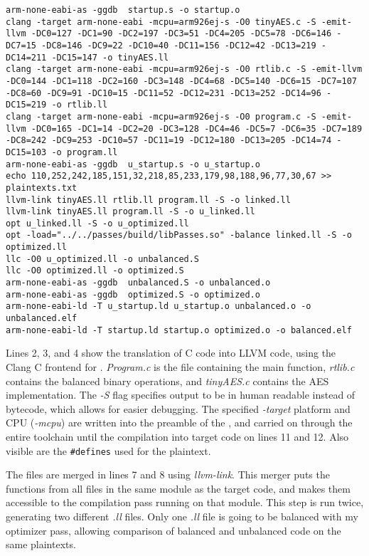 \begin{lstlisting}[caption=Output of the Makefile, label=lst:makefile-output]
arm-none-eabi-as -ggdb  startup.s -o startup.o
clang -target arm-none-eabi -mcpu=arm926ej-s -O0 tinyAES.c -S -emit-llvm -DC0=127 -DC1=90 -DC2=197 -DC3=51 -DC4=205 -DC5=78 -DC6=146 -DC7=15 -DC8=146 -DC9=22 -DC10=40 -DC11=156 -DC12=42 -DC13=219 -DC14=211 -DC15=147 -o tinyAES.ll
clang -target arm-none-eabi -mcpu=arm926ej-s -O0 rtlib.c -S -emit-llvm -DC0=144 -DC1=118 -DC2=160 -DC3=148 -DC4=68 -DC5=140 -DC6=15 -DC7=107 -DC8=60 -DC9=91 -DC10=15 -DC11=52 -DC12=231 -DC13=252 -DC14=96 -DC15=219 -o rtlib.ll
clang -target arm-none-eabi -mcpu=arm926ej-s -O0 program.c -S -emit-llvm -DC0=165 -DC1=14 -DC2=20 -DC3=128 -DC4=46 -DC5=7 -DC6=35 -DC7=189 -DC8=242 -DC9=253 -DC10=57 -DC11=19 -DC12=180 -DC13=205 -DC14=74 -DC15=103 -o program.ll
arm-none-eabi-as -ggdb  u_startup.s -o u_startup.o
echo 110,252,242,185,151,32,218,85,233,179,98,188,96,77,30,67 >> plaintexts.txt
llvm-link tinyAES.ll rtlib.ll program.ll -S -o linked.ll
llvm-link tinyAES.ll program.ll -S -o u_linked.ll
opt u_linked.ll -S -o u_optimized.ll
opt -load="../../passes/build/libPasses.so" -balance linked.ll -S -o optimized.ll
llc -O0 u_optimized.ll -o unbalanced.S
llc -O0 optimized.ll -o optimized.S
arm-none-eabi-as -ggdb  unbalanced.S -o unbalanced.o
arm-none-eabi-as -ggdb  optimized.S -o optimized.o
arm-none-eabi-ld -T u_startup.ld u_startup.o unbalanced.o -o unbalanced.elf
arm-none-eabi-ld -T startup.ld startup.o optimized.o -o balanced.elf
\end{lstlisting}

Lines 2, 3, and 4 show the translation of C code into LLVM code, using the Clang\cite{lattner2008llvm} C frontend for \llvm{}.
\emph{Program.c} is the file containing the main function, \emph{rtlib.c} contains the balanced binary operations, and \emph{tinyAES.c} contains the AES implementation.
The \emph{-S} flag specifies output to be in human readable \ir{} instead of bytecode, which allows for easier debugging.
The specified \emph{-target} platform and CPU (\emph{-mcpu}) are written into the preamble of the \ir{}, and carried on through the entire toolchain until the compilation into target code on lines 11 and 12.
Also visible are the \texttt{\#defines} used for the plaintext.

The \ir{} files are merged in lines 7 and 8 using \emph{llvm-link}.
This merger puts the functions from all files in the same module as the target code, and makes them accessible to the compilation pass running on that module.
This step is run twice, generating two different \emph{.ll} files.
Only one \emph{.ll} file is going to be balanced with my optimizer pass, allowing comparison of balanced and unbalanced code on the same plaintexts.

